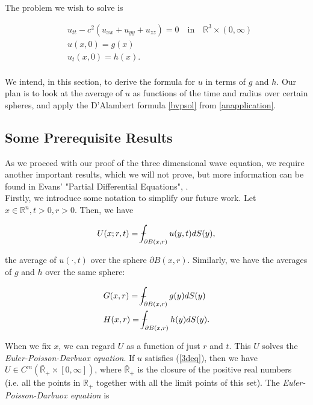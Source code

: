 \documentclass[a4paper, 12pt]{article}
\def\Xint#1{\mathchoice
{\XXint\displaystyle\textstyle{#1}}%
{\XXint\textstyle\scriptstyle{#1}}%
{\XXint\scriptstyle\scriptscriptstyle{#1}}%
{\XXint\scriptscriptstyle\scriptscriptstyle{#1}}%
\!\int}
\def\XXint#1#2#3{{\setbox0=\hbox{$#1{#2#3}{\int}$ }
\vcenter{\hbox{$#2#3$ }}\kern-.6\wd0}}
\def\dashint{\Xint-}
\numberwithin{equation}{section}
\begin{document}
The problem we wish to solve is

\begin{equation} \label{3deq}
\begin{aligned}
    &u_{tt}-c^2(u_{xx}+u_{yy}+u_{zz})=0 \quad \textrm{in} \quad \mathbb{R}^3 \times (0,\infty)\\
    &u(x,0)=g(x)\\
    &u_t(x,0)=h(x).\\
\end{aligned}
\end{equation}

We intend, in this section, to derive the formula for $u$ in terms of $g$ and $h$. Our plan is to look at the average of $u$ as 
functions of the time and radius over certain spheres, and apply the D'Alambert formula \ref{bvpsol} from \ref{anapplication}.

\subsection{Some Prerequisite Results} \label{prereq}
As we proceed with our proof of the three dimensional wave equation, we require another important results, which we will not prove, but more information
can be found in Evans' "Partial Differential Equations", \cite{Ev}.
\\

Firstly, we introduce some notation to simplify our future work. Let $x\in \mathbb{R}^n, t>0, r>0$. Then, we have

\begin{equation} \label{averageU}
    U(x;r,t)=\dashint_{\partial B(x,r)}u(y,t)dS(y),
\end{equation}

the average of $u(\cdot,t)$ over the sphere $\partial B(x,r)$. \cite{Ev} Similarly, we have the averages of $g$ and $h$ over the same sphere:

\begin{equation} \label{averageGH}
    \begin{aligned}
        &G(x,r)=\dashint_{\partial B(x,r)}g(y)dS(y)\\
        &H(x,r)=\dashint_{\partial B(x,r)}h(y)dS(y).
    \end{aligned}
\end{equation}

When we fix $x$, we can regard $U$ as a function of just $r$ and $t$. This $U$ solves the \emph{Euler-Poisson-Darbuox equation}. If $u$ satisfies
(\ref{3deq}), then we have $U \in C^m(\bar{\mathbb{R}}_+\times[0,\infty])$, where $\bar{\mathbb{R}}_+$ is the closure of the positive real numbers (i.e.
all the points in $\mathbb{R}_+$ together with all the limit points of this set). The \emph{Euler-Poisson-Darbuox equation} is
\end{document}
